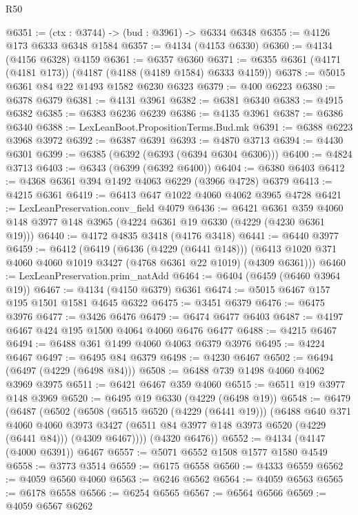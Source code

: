 \begin{lexlean}{R50}
\begin{coremodule}
@6351 := (ctx : @3744) -> (bud : @3961) -> @6334 @6348
@6355 := @4126 @173 @6333 @6348 @1584
@6357 := @4134 (@4153 @6330)
@6360 := @4134 (@4156 @6328) @4159
@6361 := @6357 @6360
@6371 := @6355 @6361 (@4171 (@4181 @173)) (@4187 (@4188 (@4189 @1584) @6333 @4159))
@6378 := @5015 @6361 @84 @22 @1493 @1582 @6230 @6323
@6379 := @400 @6223
@6380 := @6378 @6379
@6381 := @4131 @3961
@6382 := @6381 @6340
@6383 := @4915 @6382
@6385 := @6383 @6236 @6239
@6386 := @4135 @3961
@6387 := @6386 @6340
@6388 := LexLeanBoot.PropositionTerms.Bud.mk
@6391 := @6388 @6223 @3968 @3972
@6392 := @6387 @6391
@6393 := @4870 @3713
@6394 := @4430 @6301
@6399 := @6385 (@6392 (@6393 (@6394 @6304 @6306)))
@6400 := @4824 @3713
@6403 := @6343 (@6399 (@6392 @6400))
@6404 := @6380 @6403
@6412 := @4368 @6361 @394 @1492 @4063 @6229 (@3966 @4728) @6379
@6413 := @4215 @6361
@6419 := @6413 @647 @1022 @4060 @4062 @3965 @4728
@6421 := LexLeanPreservation.conv_field @4079
@6436 := @6421
    @6361
    @359
    @4060
    @148
    @3977
    @148
    @3965
    (@4224 @6361 @19 @6330 (@4229 (@4230 @6361 @19)))
@6440 := @4172 @4835 @3418 (@4176 @3418)
@6441 := @6440 @3977
@6459 := @6412
    (@6419
      (@6436 (@4229 (@6441 @148)))
      (@6413 @1020 @371 @4060 @4060 @1019 @3427 (@4768 @6361 @22 @1019) (@4309 @6361)))
@6460 := LexLeanPreservation.prim_natAdd
@6464 := @6404 (@6459 (@6460 @3964 @19))
@6467 := @4134 (@4150 @6379) @6361
@6474 := @5015 @6467 @157 @195 @1501 @1581 @4645 @6322
@6475 := @3451 @6379
@6476 := @6475 @3976
@6477 := @3426 @6476
@6479 := @6474 @6477 @6403
@6487 := @4197 @6467 @424 @195 @1500 @4064 @4060 @6476 @6477
@6488 := @4215 @6467
@6494 := @6488 @361 @1499 @4060 @4063 @6379 @3976
@6495 := @4224 @6467
@6497 := @6495 @84 @6379
@6498 := @4230 @6467
@6502 := @6494 (@6497 (@4229 (@6498 @84)))
@6508 := @6488 @739 @1498 @4060 @4062 @3969 @3975
@6511 := @6421 @6467 @359 @4060
@6515 := @6511 @19 @3977 @148 @3969
@6520 := @6495 @19 @6330 (@4229 (@6498 @19))
@6548 := @6479
    (@6487
      (@6502
        (@6508
          (@6515 @6520 (@4229 (@6441 @19)))
          (@6488
            @640
            @371
            @4060
            @4060
            @3973
            @3427
            (@6511 @84 @3977 @148 @3973 @6520 (@4229 (@6441 @84)))
            (@4309 @6467))))
      (@4320 @6476))
@6552 := @4134 (@4147 (@4000 @6391)) @6467
@6557 := @5071 @6552 @1508 @1577 @1580 @4549
@6558 := @3773 @3514
@6559 := @6175 @6558
@6560 := @4333 @6559
@6562 := @4059 @6560 @4060
@6563 := @6246 @6562
@6564 := @4059 @6563
@6565 := @6178 @6558
@6566 := @6254 @6565
@6567 := @6564 @6566
@6569 := @4059 @6567 @6262

\end{coremodule}
\end{lexlean}
